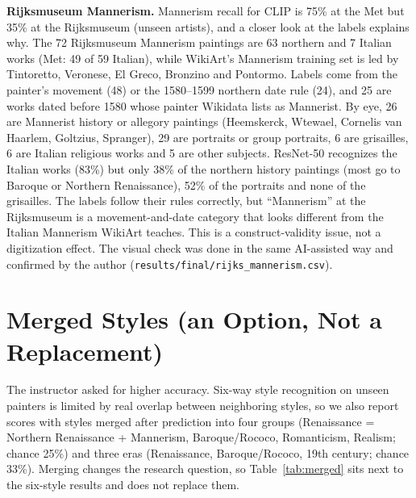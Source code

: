 \documentclass[conference]{IEEEtran}
\begin{document}
\textbf{Rijksmuseum Mannerism.} Mannerism recall for CLIP is 75\% at the Met but 35\% at the Rijksmuseum (unseen artists), and a closer look at the labels explains why. The 72 Rijksmuseum Mannerism paintings are 63 northern and 7 Italian works (Met: 49 of 59 Italian), while WikiArt's Mannerism training set is led by Tintoretto, Veronese, El Greco, Bronzino and Pontormo. Labels come from the painter's movement (48) or the 1580--1599 northern date rule (24), and 25 are works dated before 1580 whose painter Wikidata lists as Mannerist. By eye, 26 are Mannerist history or allegory paintings (Heemskerck, Wtewael, Cornelis van Haarlem, Goltzius, Spranger), 29 are portraits or group portraits, 6 are grisailles, 6 are Italian religious works and 5 are other subjects. ResNet-50 recognizes the Italian works (83\%) but only 38\% of the northern history paintings (most go to Baroque or Northern Renaissance), 52\% of the portraits and none of the grisailles. The labels follow their rules correctly, but ``Mannerism'' at the Rijksmuseum is a movement-and-date category that looks different from the Italian Mannerism WikiArt teaches. This is a construct-validity issue, not a digitization effect. The visual check was done in the same AI-assisted way and confirmed by the author (\texttt{results/final/rijks\_mannerism.csv}).

\section{Merged Styles (an Option, Not a Replacement)}

The instructor asked for higher accuracy. Six-way style recognition on unseen painters is limited by real overlap between neighboring styles, so we also report scores with styles merged after prediction into four groups (Renaissance = Northern Renaissance + Mannerism, Baroque/Rococo, Romanticism, Realism; chance 25\%) and three eras (Renaissance, Baroque/Rococo, 19th century; chance 33\%). Merging changes the research question, so Table~\ref{tab:merged} sits next to the six-style results and does not replace them.
\end{document}
